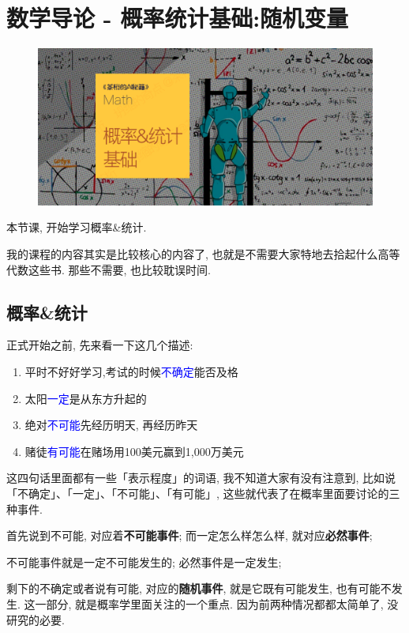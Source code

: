 \chapter{数学导论 - 概率统计基础:随机变量}
\begin{figure}[ht]
  \centering
  \includegraphics[width=1\textwidth]{asset/96cee23e-7016-44d9-909d-28b64c0b98e7.png}
\end{figure}
\newpage

本节课, 开始学习概率\&统计. 

我的课程的内容其实是比较核心的内容了, 也就是不需要大家特地去拾起什么高等代数这些书. 那些不需要, 也比较耽误时间. 

\section{概率\&统计}

正式开始之前, 先来看一下这几个描述:

\begin{enumerate}
  \item 平时不好好学习,考试的时候\textcolor{blue}{不确定}能否及格
  \item 太阳\textcolor{blue}{一定}是从东方升起的
  \item 绝对\textcolor{blue}{不可能}先经历明天, 再经历昨天
  \item 赌徒\textcolor{blue}{有可能}在赌场用100美元赢到1,000万美元
\end{enumerate}

这四句话里面都有一些「表示程度」的词语, 我不知道大家有没有注意到, 比如说「不确定」、「一定」、「不可能」、「有可能」, 这些就代表了在概率里面要讨论的三种事件. 

首先说到不可能, 对应着\textbf{不可能事件}; 而一定怎么样怎么样, 就对应\textbf{必然事件}; 

不可能事件就是一定不可能发生的; 必然事件是一定发生; 

剩下的不确定或者说有可能, 对应的\textbf{随机事件}, 就是它既有可能发生, 也有可能不发生. 这一部分, 就是概率学里面关注的一个重点. 因为前两种情况都都太简单了, 没研究的必要. 


